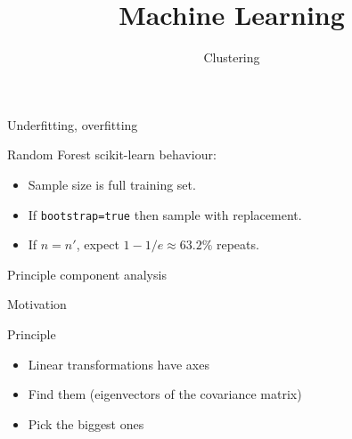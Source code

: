 
\title
{Machine Learning}
\subtitle{Clustering}



\maketitle


\begin{frame}{Underfitting, overfitting}
\end{frame}

\begin{frame}{Random Forest}
  scikit-learn behaviour:
  \begin{itemize}
  \item Sample size is full training set.
  \item If \texttt{bootstrap=true} then sample with replacement.
  \item If $n=n'$, expect $1-1/e \approx 63.2\%$ repeats.
  \end{itemize}
\end{frame}




\begin{frame}{Principle component analysis}

\end{frame}

\begin{frame}{Motivation}
\end{frame}

\begin{frame}[t]{Principle}

  \vspace{1cm}
  \begin{itemize}
  \item Linear transformations have axes
  \item Find them (eigenvectors of the covariance matrix)
  \item Pick the biggest ones
  \end{itemize}

  \vspace{5mm}
\end{frame}

